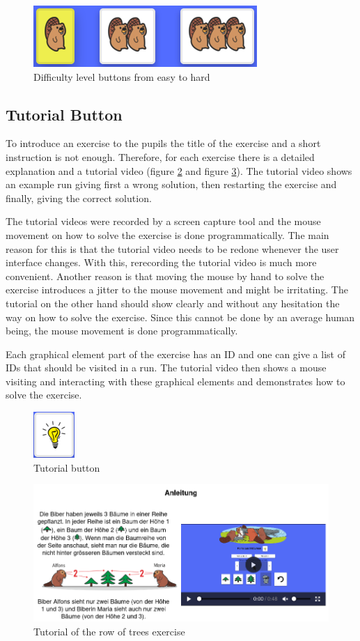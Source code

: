\begin{figure}[h]
    \centering
    \includegraphics[width=0.5\columnwidth]{figures/difficulty_level.png}
    \caption{Difficulty level buttons from easy to hard}
    \label{fig:difficultyLevels} 
\end{figure}

\subsection*{Tutorial Button}
\label{subsection:tutorial}
To introduce an exercise to the pupils the title of the exercise and a short instruction is not enough. Therefore, for each exercise there is a detailed explanation and a tutorial video (figure \ref{fig:tutorialButton} and figure \ref{fig:tutorialExample}). The tutorial video shows an example run giving first a wrong solution, then restarting the exercise and finally, giving the correct solution.

The tutorial videos were recorded by a screen capture tool and the mouse movement on how to solve the exercise is done programmatically. The main reason for this is that the tutorial video needs to be redone whenever the user interface changes. With this, rerecording the tutorial video is much more convenient. Another reason is that moving the mouse by hand to solve the exercise introduces a jitter to the mouse movement and might be irritating. The tutorial on the other hand should show clearly and without any hesitation the way on how to solve the exercise. Since this cannot be done by an average human being, the mouse movement is done programmatically. 

Each graphical element part of the exercise has an ID and one can give a list of IDs that should be visited in a run. The tutorial video then shows a mouse visiting and interacting with these graphical elements and demonstrates how to solve the exercise. 

\begin{figure}[h]
    \centering
    \includegraphics[width=0.1\columnwidth]{figures/tutorial_button.png}
    \caption{Tutorial button}
    \label{fig:tutorialButton} 
\end{figure}
\begin{figure}[h]
    \centering
    \includegraphics[width=0.5\columnwidth]{figures/tutorial_example.png}
    \caption{Tutorial of the row of trees exercise}
    \label{fig:tutorialExample} 
\end{figure}